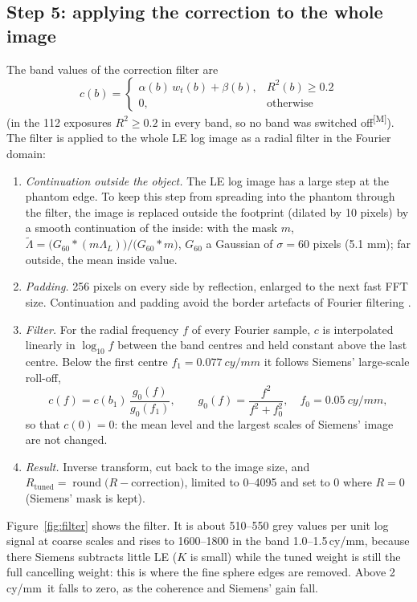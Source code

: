 \documentclass[11pt,a4paper]{article}
\newcommand{\LL}{\Lambda_L}
\newcommand{\wt}{w_t}
\newcommand{\M}{\textsuperscript{[M]}}
\newcommand{\cymm}{\,cy/mm}
\begin{document}
\subsection{Step 5: applying the correction to the whole image}\label{sec:apply}
The band values of the correction filter are
\begin{equation}
c(b)=\begin{cases}\alpha(b)\,\wt(b)+\beta(b), & R^2(b)\ge0.2\\ 0, & \text{otherwise}\end{cases}
\end{equation}
(in the 112 exposures $R^2\ge0.2$ in every band, so no band was switched off\M). The filter is applied to the whole LE
log image as a radial filter in the Fourier domain:
\begin{enumerate}
\item \emph{Continuation outside the object.} The LE log image has a large step at the phantom edge. To keep this
step from spreading into the phantom through the filter, the image is replaced outside the footprint (dilated by
10 pixels) by a smooth continuation of the inside: with the mask $m$,
$\tilde\Lambda=\big(G_{60}*(m\LL)\big)/\big(G_{60}*m\big)$, $G_{60}$ a Gaussian of $\sigma=60$ pixels (5.1 mm); far outside,
the mean inside value.
\item \emph{Padding.} 256 pixels on every side by reflection, enlarged to the next fast FFT size. Continuation
and padding avoid the border artefacts of Fourier filtering \cite{moisan2011,liu2008}.
\item \emph{Filter.} For the radial frequency $f$ of every Fourier sample, $c$ is interpolated linearly in
$\log_{10}f$ between the band centres and held constant above the last centre. Below the first centre
$f_1=\SI{0.077}{cy/mm}$ it follows Siemens' large-scale roll-off,
\begin{equation}
c(f)=c(b_1)\,\frac{g_0(f)}{g_0(f_1)},\qquad g_0(f)=\frac{f^2}{f^2+f_0^2},\quad f_0=\SI{0.05}{cy/mm},
\label{eq:rolloff}
\end{equation}
so that $c(0)=0$: the mean level and the largest scales of Siemens' image are not changed.
\item \emph{Result.} Inverse transform, cut back to the image size, and
$R_\mathrm{tuned}=\operatorname{round}\big(R-\text{correction}\big)$, limited to 0--4095 and set to 0 where $R=0$
(Siemens' mask is kept).
\end{enumerate}
Figure~\ref{fig:filter} shows the filter. It is about 510--550 grey values per unit log signal at coarse scales and
rises to 1600--1800 in the band 1.0--1.5\cymm, because there Siemens subtracts little LE ($K$ is small) while the tuned
weight is still the full cancelling weight: this is where the fine sphere edges are removed. Above 2\cymm\ it falls
to zero, as the coherence and Siemens' gain fall.
\end{document}
